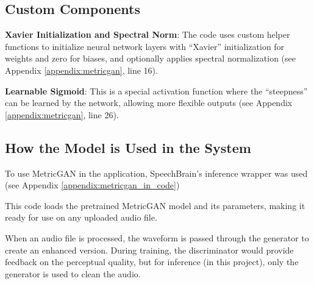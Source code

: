 \subsection{Custom Components}

\textbf{Xavier Initialization and Spectral Norm}: The code uses custom helper functions to initialize neural network layers with “Xavier” initialization for weights and zero for biases, and optionally applies spectral normalization (see Appendix \ref{appendix:metricgan}, line 16).

\textbf{Learnable Sigmoid}: This is a special activation function where the “steepness” can be learned by the network, allowing more flexible outputs (see Appendix \ref{appendix:metricgan}, line 26).

\subsection{How the Model is Used in the System}
To use MetricGAN in the application, SpeechBrain’s inference wrapper was used (see Appendix \ref{appendix:metricgan_in_code})

This code loads the pretrained MetricGAN model and its parameters, making it ready for use on any uploaded audio file.

When an audio file is processed, the waveform is passed through the generator to create an enhanced version. During training, the discriminator would provide feedback on the perceptual quality, but for inference (in this project), only the generator is used to clean the audio.



